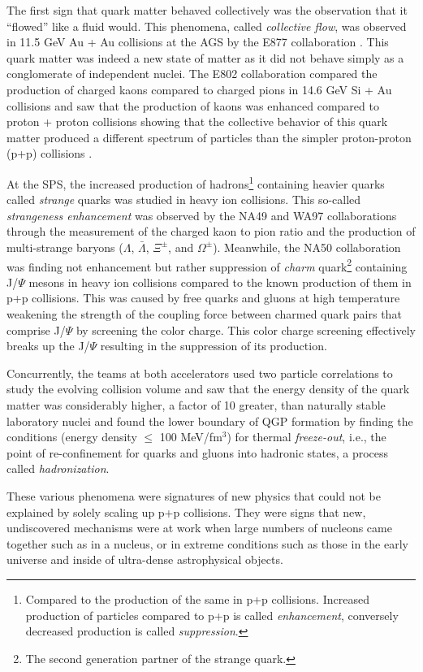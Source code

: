 The first sign that quark matter behaved collectively was the observation that it ``flowed'' like a fluid would. This phenomena, called \textit{collective flow}, was observed in 11.5 GeV Au + Au collisions at the AGS by the E877 collaboration \citep{Barrette:1999rx}. This quark matter was indeed a new state of matter as it did not behave simply as a conglomerate of independent nuclei. The E802 collaboration compared the production of charged kaons compared to charged pions in 14.6 GeV Si + Au collisions and saw that the production of kaons was enhanced compared to proton + proton collisions showing that the collective behavior of this quark matter produced a different spectrum of particles than the simpler proton-proton (p+p) collisions \citep{PhysRevLett.64.847}. 

At the SPS, the increased production of hadrons\footnote{Compared to the production of the same in p+p collisions. Increased production of particles compared to p+p is called \textit{enhancement}, conversely decreased production is called \textit{suppression}.} containing heavier quarks called \textit{strange} quarks was studied in heavy ion collisions. This so-called \textit{strangeness enhancement} was observed by the NA49\citep{Hohne:1999jf} and WA97 collaborations through the measurement of the charged kaon to pion ratio and the production of multi-strange baryons ($\Lambda$, $\bar{\Lambda}$, $\Xi^{\pm}$, and $\Omega^{\pm}$). Meanwhile, the NA50 collaboration was finding not enhancement but rather suppression of \textit{charm} quark\footnote{The second generation partner of the strange quark.} containing J/$\Psi$ mesons in heavy ion collisions compared to the known production of them in p+p collisions\citep{Abreu:2000ni}. This was caused by free quarks and gluons at high temperature weakening the strength of the coupling force between charmed quark pairs that comprise J/$\Psi$ by screening the color charge. This color charge screening effectively breaks up the J/$\Psi$ resulting in the suppression of its production.

Concurrently, the teams at both accelerators used two particle correlations to study the evolving collision volume and saw that the energy density of the quark matter was considerably higher, a factor of 10 greater, than naturally stable laboratory nuclei \citep{Heinz:1999rw} and found the lower boundary of QGP formation by finding the conditions (energy density $\leq$ 100 MeV/fm$^{3}$) for thermal \textit{freeze-out}\citep{BraunMunzinger:1998cg}, i.e., the point of re-confinement for quarks and gluons into hadronic states, a process called \textit{hadronization}.

These various phenomena were signatures of new physics that could not be explained by solely scaling up p+p collisions. They were signs that new, undiscovered mechanisms were at work when large numbers of nucleons came together such as in a nucleus, or in extreme conditions such as those in the early universe and inside of ultra-dense astrophysical objects. 
\pagebreak
\pagebreak
